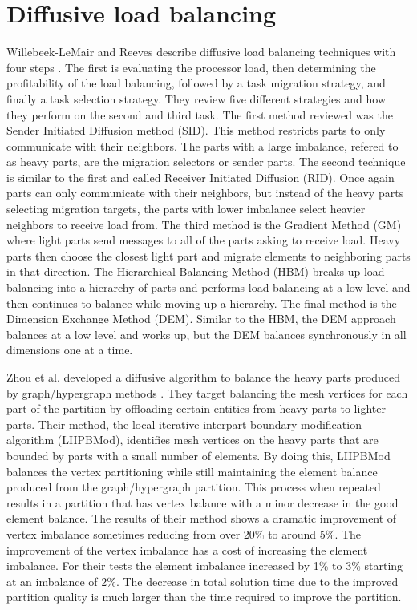 \documentclass{thesis}
\begin{document}
\section{Diffusive load balancing}
Willebeek-LeMair and Reeves describe diffusive load balancing techniques with 
four steps \cite{loadbalance}. The first is evaluating the processor load, then 
determining the profitability of the load balancing, followed by a task 
migration strategy, and finally a task selection strategy. They review 
five different strategies and how they perform on the second and third task. 
The first method reviewed was the Sender Initiated Diffusion method (SID). 
This method restricts parts to only communicate with their neighbors. The 
parts with a large imbalance, refered to as heavy parts, are the migration 
selectors or sender parts. The second technique is 
similar to the first and called Receiver Initiated Diffusion (RID). Once again 
parts can only communicate with their neighbors, but instead of the heavy parts
selecting migration targets, the parts with lower imbalance select heavier 
neighbors to receive
load from. The third method is the Gradient Method (GM) where light parts send 
messages to all of the parts asking to receive load. Heavy parts then choose 
the closest light part and migrate elements to neighboring parts in that 
direction. The Hierarchical Balancing Method (HBM) breaks up load balancing 
into a 
hierarchy of parts and performs load balancing at a low level and then continues
to balance while moving up a hierarchy. The final method is the Dimension 
Exchange Method (DEM). Similar to the HBM, the DEM approach balances at a low 
level and works up, but the DEM balances synchronously in all dimensions one at 
a time.

Zhou et al. developed a diffusive algorithm to balance the heavy parts produced 
by graph/hypergraph methods \cite{zhougraph}. They target balancing the mesh vertices for each
part of the partition by offloading certain entities from heavy parts to 
lighter parts. Their method, the local iterative interpart boundary 
modification algorithm (LIIPBMod), identifies mesh vertices on the heavy parts
that are bounded by parts with a small number of elements. By doing this, LIIPBMod 
balances the vertex partitioning while still maintaining the element balance
produced from the graph/hypergraph partition. This process when repeated 
results in a partition that has vertex balance with a minor decrease in the 
good element balance. The results of their method shows a dramatic improvement
of vertex imbalance sometimes reducing from over 20\% to around 5\%. The improvement of the vertex imbalance has a cost of increasing the element imbalance. For their tests the element imbalance increased by 1\% to 3\% starting at an imbalance of 2\%. %
The decrease in total solution time due to the improved partition quality is much larger than the time required to improve the partition.
\end{document}
